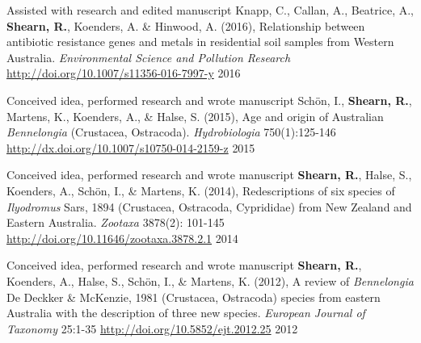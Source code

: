 \begin{cvpubs}
\cvpub
    {Assisted with research and edited manuscript} %
    {Knapp, C., Callan, A., Beatrice, A., \textbf{Shearn, R.}, Koenders, A. \& Hinwood, A. (2016), Relationship between antibiotic resistance genes and metals in residential soil samples from Western Australia. \emph{Environmental Science and Pollution Research} \href{http://doi.org/10.1007/s11356-016-7997-y}{http://doi.org/10.1007/s11356-016-7997-y}} %
    {2016} %

  \cvpub
    {Conceived idea, performed research and wrote manuscript} %
    {Schön, I., \textbf{Shearn, R.}, Martens, K., Koenders, A., \& Halse, S. (2015), Age and origin of Australian \textit{Bennelongia} (Crustacea, Ostracoda). \emph{Hydrobiologia} 750(1):125-146 \href{http://dx.doi.org/10.1007/s10750-014-2159-z}{http://dx.doi.org/10.1007/s10750-014-2159-z}} %
    {2015} %

  \cvpub
    {Conceived idea, performed research and wrote manuscript} %
    {\textbf{Shearn, R.}, Halse, S., Koenders, A., Schön, I., \& Martens, K. (2014), Redescriptions of six species of \textit{Ilyodromus} Sars, 1894 (Crustacea, Ostracoda, Cyprididae) from New Zealand and Eastern Australia. \emph{Zootaxa} 3878(2): 101-145 \href{http://doi.org/10.11646/zootaxa.3878.2.1}{http://doi.org/10.11646/zootaxa.3878.2.1}} %
    {2014} %

  \cvpub
    {Conceived idea, performed research and wrote manuscript} %
    {\textbf{Shearn, R.}, Koenders, A., Halse, S., Schön, I., \& Martens, K. (2012), A review of \textit{Bennelongia} De Deckker \& McKenzie, 1981 (Crustacea, Ostracoda) species from eastern Australia with the description of three new species. \emph{European Journal of Taxonomy} 25:1-35 \href{http://doi.org/10.5852/ejt.2012.25}{http://doi.org/10.5852/ejt.2012.25}} %
    {2012} %

\end{cvpubs}



